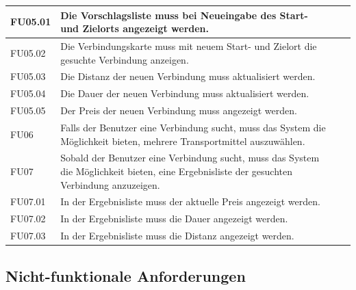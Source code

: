 \documentclass[a4paper, 11pt]{scrreprt}
\begin{document}
\begin{table}[h]
\begin{tabular}{|p{2.5cm} p{12cm}| ll}
\hline
FU05.01	&Die Vorschlagsliste muss bei Neueingabe des Start- und Zielorts angezeigt werden.\\

\hline
FU05.02	&Die Verbindungskarte muss mit neuem Start- und Zielort die gesuchte Verbindung anzeigen.\\

\hline
FU05.03	&Die Distanz der neuen Verbindung muss aktualisiert werden.\\

\hline
FU05.04&	Die Dauer der neuen Verbindung muss aktualisiert werden.\\

\hline
FU05.05	&Der Preis der neuen Verbindung muss angezeigt werden.\\

\hline
FU06	&Falls der Benutzer eine Verbindung sucht, muss das System die Möglichkeit bieten, mehrere Transportmittel auszuwählen.\\

\hline
FU07	&Sobald der Benutzer eine Verbindung sucht, muss das System die Möglichkeit bieten, eine Ergebnisliste der gesuchten Verbindung anzuzeigen.\\

\hline
FU07.01&	In der Ergebnisliste muss der aktuelle Preis angezeigt werden.\\

\hline
FU07.02 &	In der Ergebnisliste muss die Dauer angezeigt werden.\\

\hline
FU07.03&	In der Ergebnisliste muss die Distanz angezeigt werden.\\

\hline


\end{tabular}

\end{table}

\subsection{Nicht-funktionale Anforderungen}
\end{document}
